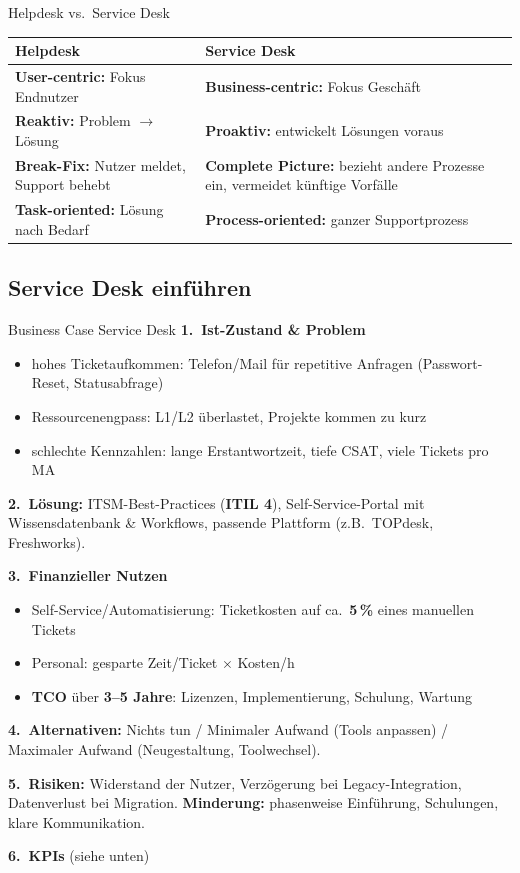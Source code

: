 \documentclass[a4paper, fontsize=7pt]{scrartcl}
\renewcommand*{\arraystretch}{1.5}  %
\begin{document}
\begin{mainbox}{Helpdesk vs.\ Service Desk}
\renewcommand*{\arraystretch}{1.2}
\begin{tabularx}{\linewidth}{@{}>{\raggedright\arraybackslash}X|>{\raggedright\arraybackslash}X@{}}
\textbf{Helpdesk} & \textbf{Service Desk} \\
\hline
\textbf{User-centric:} Fokus Endnutzer & \textbf{Business-centric:} Fokus
  Geschäft \\
\textbf{Reaktiv:} Problem $\to$ Lösung & \textbf{Proaktiv:} entwickelt
  Lösungen voraus \\
\textbf{Break-Fix:} Nutzer meldet, Support behebt & \textbf{Complete Picture:}
  bezieht andere Prozesse ein, vermeidet künftige Vorfälle \\
\textbf{Task-oriented:} Lösung nach Bedarf & \textbf{Process-oriented:} ganzer
  Supportprozess \\
\end{tabularx}
\end{mainbox}

\subsection{Service Desk einführen}

\begin{mainbox}{Business Case Service Desk}
\textbf{1.\ Ist-Zustand \& Problem}
\begin{itemize}
    \item hohes Ticketaufkommen: Telefon/Mail für repetitive Anfragen
          (Passwort-Reset, Statusabfrage)
    \item Ressourcenengpass: L1/L2 überlastet, Projekte kommen zu kurz
    \item schlechte Kennzahlen: lange Erstantwortzeit, tiefe CSAT, viele
          Tickets pro MA
\end{itemize}
\textbf{2.\ Lösung:} ITSM-Best-Practices (\textbf{ITIL 4}),
Self-Service-Portal mit Wissensdatenbank \& Workflows, passende Plattform
(z.B.\ TOPdesk, Freshworks).

\textbf{3.\ Finanzieller Nutzen}
\begin{itemize}
    \item Self-Service/Automatisierung: Ticketkosten auf ca.\ \textbf{5\,\%}
          eines manuellen Tickets
    \item Personal: gesparte Zeit/Ticket $\times$ Kosten/h
    \item \textbf{TCO} über \textbf{3--5 Jahre}: Lizenzen, Implementierung,
          Schulung, Wartung
\end{itemize}
\textbf{4.\ Alternativen:} Nichts tun / Minimaler Aufwand (Tools anpassen) /
Maximaler Aufwand (Neugestaltung, Toolwechsel).

\textbf{5.\ Risiken:} Widerstand der Nutzer, Verzögerung bei
Legacy-Integration, Datenverlust bei Migration.
\textbf{Minderung:} phasenweise Einführung, Schulungen, klare Kommunikation.

\textbf{6.\ KPIs} (siehe unten)
\end{mainbox}
\end{document}
